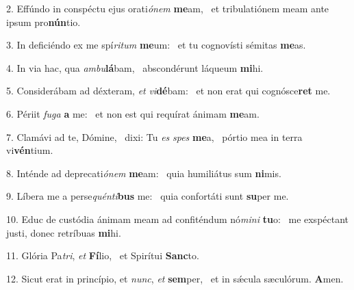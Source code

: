 2. Effúndo in conspéctu ejus orati\textit{ó}\textit{nem} \textbf{me}am, \ast\  et tribulatiónem meam ante ipsum pro\textbf{nún}tio.\

3. In deficiéndo ex me spí\textit{ri}\textit{tum} \textbf{me}um: \ast\  et tu cognovísti sémitas \textbf{me}as.\

4. In via hac, qua \textit{am}\textit{bu}\textbf{lá}bam, \ast\  abscondérunt láqueum \textbf{mi}hi.\

5. Considerábam ad déxteram, \textit{et} \textit{vi}\textbf{dé}bam: \ast\  et non erat qui cognósce\textbf{ret} me.\

6. Périit \textit{fu}\textit{ga} \textbf{a} me: \ast\  et non est qui requírat ánimam \textbf{me}am.\

7. Clamávi ad te, Dómine, \dag\  dixi: Tu \textit{es} \textit{spes} \textbf{me}a, \ast\  pórtio mea in terra vi\textbf{vén}tium.\

8. Inténde ad deprecati\textit{ó}\textit{nem} \textbf{me}am: \ast\  quia humiliátus sum \textbf{ni}mis.\

9. Líbera me a perse\textit{quén}\textit{ti}\textbf{bus} me: \ast\  quia confortáti sunt \textbf{su}per me.\

10. Educ de custódia ánimam meam ad confiténdum nó\textit{mi}\textit{ni} \textbf{tu}o: \ast\  me exspéctant justi, donec retríbuas \textbf{mi}hi.\

11. Glória Pa\textit{tri}, \textit{et} \textbf{Fí}lio, \ast\  et Spirítui \textbf{Sanc}to.\

12. Sicut erat in princípio, et \textit{nunc}, \textit{et} \textbf{sem}per, \ast\  et in sǽcula sæculórum. \textbf{A}men.\


